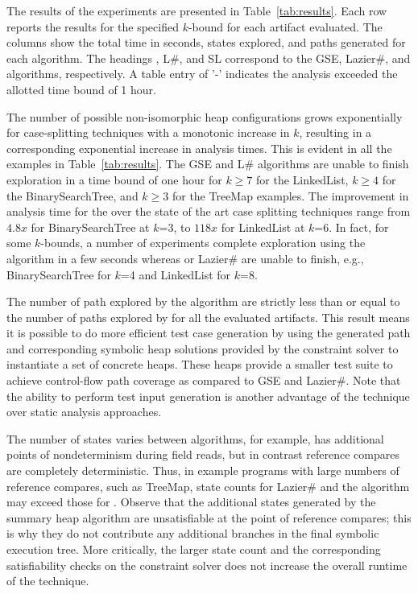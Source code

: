 The results of the experiments are presented in
Table~\ref{tab:results}.  Each row reports the results for the
specified $k$-bound for each artifact evaluated. The columns show the
total time in seconds, states explored, and paths generated for each
algorithm. The headings \gsetxt{}, L\#, and SL correspond to the GSE,
Lazier\#, and \symtxt{} algorithms, respectively. A table entry of '-' indicates
the analysis exceeded the allotted time bound of 1 hour.

The number of possible non-isomorphic heap configurations grows
exponentially for case-splitting techniques with a monotonic increase
in $k$, resulting in a corresponding exponential increase in analysis
times. This is evident in all the examples in
Table~\ref{tab:results}. The GSE and L\# algorithms are unable to
finish exploration in a time bound of one hour for $k\geq 7$ for the
LinkedList, $k\geq 4$ for the BinarySearchTree, and $k\geq 3$ for the
TreeMap examples. The improvement in analysis time for the \symtxt{}
over the state of the art case splitting techniques range from $4.8x$
for BinarySearchTree at $k$=3, to $118x$ for LinkedList at $k$=6. In
fact, for some $k$-bounds, a number of experiments complete exploration
using the \symtxt{} algorithm in a few seconds whereas \gsetxt{} or
Lazier\# are unable to finish, e.g., BinarySearchTree for $k$=4 and
LinkedList for $k$=8. 

The number of path explored by the \symtxt{} algorithm are strictly less
than or equal to the number of paths explored by \gsetxt{} for all the
evaluated artifacts. This result means it is possible to do more efficient test
case generation by using the generated path and corresponding symbolic heap
solutions provided by the constraint solver to
instantiate a set of concrete heaps. These heaps
provide a smaller test suite to achieve control-flow path coverage as
compared to GSE and Lazier\#. Note that the ability to perform test
input generation is another advantage of the \symtxt{} technique over
static analysis approaches.

The number of states varies between algorithms, for example, \gsetxt{}
has additional points of nondeterminism during field reads, but in
contrast reference compares are completely deterministic. Thus, in
example programs with large numbers of reference compares, such as
TreeMap, state counts for Lazier\# and the \symtxt{} algorithm may
exceed those for \gsetxt{}. Observe that the additional states
generated by the summary heap algorithm are unsatisfiable at the point
of reference compares; this is why they do not contribute any
additional branches in the final symbolic execution tree. More critically,
the larger state count and the corresponding satisfiability checks on
the constraint solver does not increase the overall runtime of the
technique.


